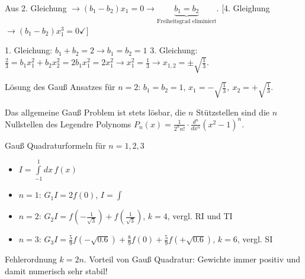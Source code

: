\documentclass[a4paper,ngerman]{scrbook}
\begin{document}
Aus 2. Gleichung $\to (b_1-b_2)x_1 = 0 \to \underbrace{b_1 = b_2}_{\text{Freiheitsgrad eliminiert}}$. [4. Gleighung $\to (b_1-b_2)x_1^3 = 0 \checkmark$]

1. Gleichung: $b_1 + b_2 = 2 \to b_1 = b_2 = 1$
3. Gleichung: $\frac{2}{3} = b_1x_1^2 + b_2x_2^2 = 2b_1 x_1^2 = 2x_1^2 \to x_1^2 = \frac{1}{3} \to x_{1,2} = \pm \sqrt{\frac{1}{3}}$.

Lösung des Gauß Ansatzes für $n=2$: $b_1 = b_2 = 1$, $x_1 = -\sqrt{\frac{1}{3}},\ x_2 = +\sqrt{\frac{1}{3}}$.

Das allgemeine Gauß Problem ist stets lösbar, die $n$ Stützstellen sind die $n$ Nullstellen des Legendre Polynoms $P_n(x) = \frac{1}{2^n n!}\cdot \frac{d^n}{dx^n} (x^2 - 1)^n$.

Gauß Quadraturformeln für $n=1,2,3$

\begin{itemize}
\item $I = \int\limits_{-1}^1 dx\, f(x)$
\item $n=1$: $G_1I = 2f(0)$, $I = \int$
\item $n=2$: $G_2I = f\left(-\frac{1}{\sqrt{3}}\right) + f\left(\frac{1}{\sqrt{3}}\right)$, $k=4$, vergl\@. RI und TI
\item $n=3$: $G_3I = \frac{5}{9} f(-\sqrt{0.6}) + \frac{8}{9} f(0) + \frac{5}{9}f\left(+\sqrt{0.6}\right)$, $k=6$, vergl\@. SI
\end{itemize}

Fehlerordnung $k=2n$. Vorteil von Gauß Quadratur: Gewichte immer positiv und damit numerisch sehr stabil!
\end{document}
